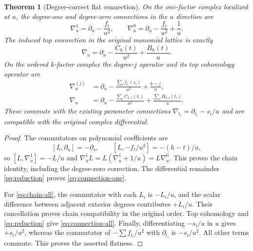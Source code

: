 \documentclass[11pt]{article}
\newtheorem{theorem}{Theorem}
\begin{document}
\begin{theorem}[Degree-correct flat connection]
On the one-factor complex localized at $u$, the degree-one and
degree-zero connections in the $u$ direction are
\begin{equation}
 \nabla_u^1=\partial_u-\frac{f_t}{u^2},\qquad
 \nabla_u^0=\partial_u-\frac{f_t}{u^2}+\frac1u.
 \label{eq:chain-one}
\end{equation}
The induced top connection in the original monomial lattice is exactly
\begin{equation}
 \boxed{\nabla_u=\partial_u-\frac{C_h(t)}{u^2}
                                  +\frac{B_h(t)}u.}
 \label{eq:connection-one}
\end{equation}
On the ordered $k$-factor complex the degree-$j$ operator and its top
cohomology operator are
\begin{align}
 \nabla_u^{(j)}&=\partial_u-
       \frac{\sum_i f_{t_i}(s_i)}{u^2}+\frac{k-j}{u},
       \label{eq:chain-all}\\
 \boxed{\nabla_u}&=\boxed{\partial_u-
       \frac{\sum_i C_{h,i}(t_i)}{u^2}
                +\frac{\sum_i B_{h,i}(t_i)}u.}
       \label{eq:connection-all}
\end{align}
These commute with the existing parameter connections
$\nabla_{t_i}=\partial_{t_i}-s_i/u$ and are compatible with the
original complex differential.
\end{theorem}
\begin{proof}
The commutators on polynomial coefficients are
\[
 [L,\partial_u]=-\partial_s,\qquad
 [L,-f_t/u^2]=-(h-t)/u,
\]
so $[L,\nabla_u^1]=-L/u$ and
$\nabla_u^1L=L(\nabla_u^1+1/u)=L\nabla_u^0$.
This proves the chain identity, including the degree-zero correction.
The differential remainder \eqref{eq:reduction} proves
\eqref{eq:connection-one}.

For \eqref{eq:chain-all}, the commutator with each $L_i$ is
$-L_i/u$, and the scalar difference between adjacent exterior degrees
contributes $+L_i/u$.  Their cancellation proves chain compatibility
in the original order.  Top cohomology and
\eqref{eq:reduction} give \eqref{eq:connection-all}.
Finally, differentiating $-s_i/u$ in $u$ gives $+s_i/u^2$, whereas
the commutator of $-\sum f_{t_l}/u^2$ with $\partial_{t_i}$ is
$-s_i/u^2$.  All other terms commute.  This proves the asserted
flatness.
\end{proof}
\end{document}

